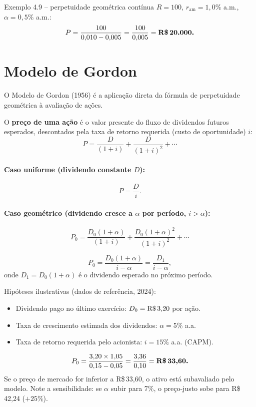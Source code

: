 \begin{exemplo}{Exemplo 4.9 -- perpetuidade geométrica contínua}
$R = 100$, $r_{\text{am}} = 1{,}0\%$ a.m., $\alpha = 0{,}5\%$ a.m.:
\[
  P = \frac{100}{0{,}010 - 0{,}005} = \frac{100}{0{,}005} = \textbf{R\$\,20.000.}
\]
\end{exemplo}

\section{Modelo de Gordon}

O Modelo de Gordon (1956) é a aplicação direta da fórmula de perpetuidade geométrica à avaliação
de ações.

\begin{definicao}
O \textbf{preço de uma ação} é o valor presente do fluxo de dividendos futuros esperados,
descontados pela taxa de retorno requerida (custo de oportunidade) $i$:
\[
  P = \frac{D}{(1+i)} + \frac{D}{(1+i)^2} + \cdots
\]
\end{definicao}

\paragraph{Caso uniforme (dividendo constante $D$):}
\[
  P = \frac{D}{i}.
\]

\paragraph{Caso geométrico (dividendo cresce a $\alpha$ por período, $i > \alpha$):}
\[
  P_0 = \frac{D_0(1+\alpha)}{(1+i)} + \frac{D_0(1+\alpha)^2}{(1+i)^2} + \cdots
\]

\begin{resultado}
\[
  \boxed{P_0 = \frac{D_0(1+\alpha)}{i - \alpha} = \frac{D_1}{i - \alpha},}
\]
onde $D_1 = D_0(1+\alpha)$ é o dividendo esperado no próximo período.
\end{resultado}

\begin{moderno}[title={Modelo de Gordon -- Petrobras (PETR4)}]
Hipóteses ilustrativas (dados de referência, 2024):
\begin{itemize}[leftmargin=1.8em, nosep]
  \item Dividendo pago no último exercício: $D_0 = \text{R\$\,}3{,}20$ por ação.
  \item Taxa de crescimento estimada dos dividendos: $\alpha = 5\%$ a.a.
  \item Taxa de retorno requerida pelo acionista: $i = 15\%$ a.a. (CAPM).
\end{itemize}
\[
  P_0 = \frac{3{,}20 \times 1{,}05}{0{,}15 - 0{,}05}
       = \frac{3{,}36}{0{,}10} = \textbf{R\$\,33{,}60.}
\]
Se o preço de mercado for inferior a R\$\,33,60, o ativo está subavaliado pelo modelo.
Note a sensibilidade: se $\alpha$ subir para $7\%$, o preço-justo sobe para R\$\,42,24 ($+25\%$).
\end{moderno}
